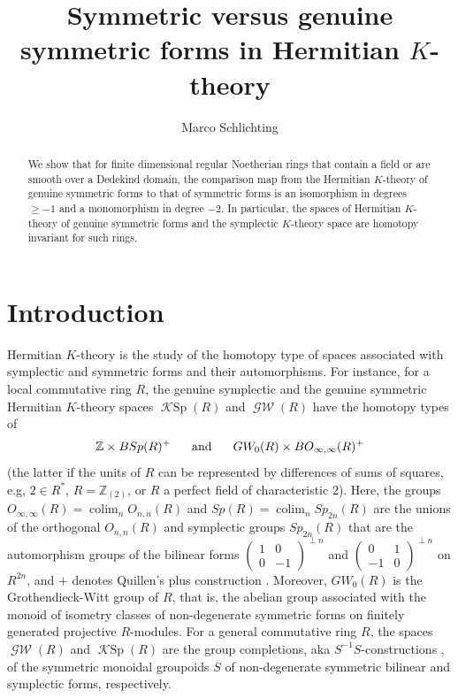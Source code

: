 \documentclass[10pt,twoside,a4paper,reqno]{amsart}
\title[$\Qoppa^{gs}$ vs $\Qoppa^s$]{Symmetric versus genuine symmetric forms in Hermitian $K$-theory}
\author{Marco Schlichting}
\theoremstyle{definition}
\numberwithin{equation}{section}
\newcommand{\Z}{\mathbb{Z}}
\newcommand{\colim}{\operatorname{colim}}
\newcommand{\GW}{\operatorname{\mathcal{GW}}}
\newcommand{\KSp}{\operatorname{\mathcal{K}Sp}}
\renewcommand{\|}{\operatorname{|}}
\begin{document}





\begin{abstract}
We show that for finite dimensional regular Noetherian rings that contain a field or are smooth over a Dedekind domain, the comparison map from the Hermitian $K$-theory of genuine symmetric forms to that of  symmetric forms is an isomorphism in degrees $\geq -1$ and a monomorphism in degree $-2$.
In particular, the spaces of Hermitian $K$-theory of genuine symmetric forms and the symplectic $K$-theory space are homotopy invariant for such rings.
\end{abstract}

\maketitle


\tableofcontents

\section{Introduction}

Hermitian $K$-theory is the study of the homotopy type of spaces associated with symplectic and symmetric forms and their automorphisms.
For instance, for a local commutative ring $R$, the genuine symplectic and the genuine symmetric Hermitian $K$-theory spaces $\KSp(R)$ 
and $\GW(R)$ have the homotopy types of  
$$\Z \times BSp(R)^+\hspace{4ex}\text{and} \hspace{4ex}GW_0(R) \times BO_{\infty,\infty}(R)^+$$ 
(the latter if the units of $R$ can be represented by differences of sums of squares, e.g, $2\in R^*$, $R=\Z_{(2)}$, or $R$ a perfect field of characteristic $2$).
Here, the groups $O_{\infty,\infty}(R)=\colim_nO_{n,n}(R)$ and $Sp(R)=\colim_nSp_{2n}(R)$ are the unions of the orthogonal  $O_{n,n}(R)$ and symplectic groups $Sp_{2n}(R)$ that are the automorphism groups of the bilinear forms $\left(\begin{smallmatrix}1 & 0 \\ 0 & -1\end{smallmatrix}\right)^{\perp n}$ and $\left(\begin{smallmatrix} 0 & 1 \\ -1 & 0 \end{smallmatrix}\right)^{\perp n}$ on $R^{2n}$, and $+$ denotes Quillen's plus construction \cite{Grayson:KII}.
Moreover, $GW_0(R)$ is the Grothendieck-Witt group of $R$, that is, the abelian group associated with the monoid of isometry classes of non-degenerate symmetric forms on finitely generated projective $R$-modules.
For a general commutative ring $R$, the spaces $\GW(R)$ and $\KSp(R)$ are the group completions, aka $S^{-1}S$-constructions \cite{Grayson:KII}, of the symmetric monoidal groupoids $S$ of non-degenerate symmetric bilinear and symplectic forms, respectively.
\end{document}
